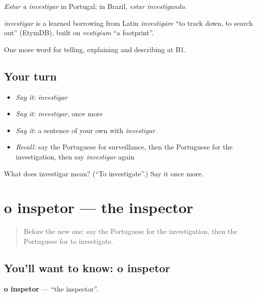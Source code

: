 \emph{Estar a investigar} in Portugal; in Brazil, \emph{estar investigando}.

\begin{cousinweb}
\emph{investigar} is a learned borrowing from Latin \emph{investīgāre} \textquotedblleft{}to track down, to search out\textquotedblright{} (EtymDB), built on \emph{vestīgium} \textquotedblleft{}a footprint\textquotedblright{}.
\end{cousinweb}

\begin{grammarlens}[title={What you've built}]
One more word for telling, explaining and describing at B1.
\end{grammarlens}

\subsection*{Your turn}
\begin{itemize}
\raggedright
  \item \emph{Say it:} \emph{investigar}
  \item \emph{Say it:} \emph{investigar}, once more
  \item \emph{Say it:} a sentence of your own with \emph{investigar}
  \item \emph{Recall:} say the Portuguese for surveillance, then the Portuguese for the investigation, then say \emph{investigar} again
\end{itemize}

\begin{tcolorbox}[breakable,colback=teal!4,colframe=teal!35!black,title={Before you move on}]
What does investigar mean? (\textquotedblleft{}To investigate\textquotedblright{}.) Say it once more.
\end{tcolorbox}
\section[o inspetor]{o inspetor — the inspector}

\label{lesson:PT-C294-inspetor}



\begin{quote}
Before the new one: say the Portuguese for the investigation, then the Portuguese for to investigate.
\end{quote}

\subsection*{You'll want to know: o inspetor}
\textbf{o inspetor} — \textquotedblleft{}the inspector\textquotedblright{}.

